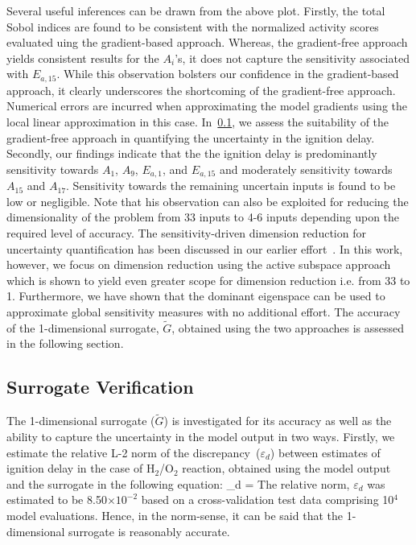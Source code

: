 Several useful inferences can be drawn from the above plot. Firstly, the total Sobol indices are found to be
consistent
with the normalized activity scores evaluated uing the gradient-based approach. Whereas, the gradient-free
approach yields consistent results for the $A_i$'s, it does not capture the sensitivity associated with
$E_{a,15}$. While this observation bolsters our confidence in the gradient-based approach, it clearly
underscores the shortcoming of the gradient-free approach. Numerical errors are incurred when approximating
the model gradients using the local linear approximation in this case. In~\ref{sub:verify}, we assess the
suitability of the gradient-free approach in quantifying the uncertainty in the ignition delay. 
Secondly, our findings indicate that the  
the ignition delay is predominantly sensitivity towards $A_1$, $A_9$, $E_{a,1}$, and $E_{a,15}$ and 
moderately sensitivity towards $A_{15}$ and $A_{17}$. Sensitivity towards the remaining uncertain inputs is
found to be low or negligible. Note that his observation can also be exploited for reducing the 
dimensionality of the problem from 33 inputs to 4-6 inputs depending upon the required level of accuracy.
The sensitivity-driven dimension reduction for uncertainty quantification has been
discussed in our earlier effort~\cite{Vohra:2018}. In this work, however, we focus on dimension reduction using the active 
subspace approach which is shown to yield even greater scope for dimension reduction i.e. from 33 to 1. Furthermore, we have
shown that the dominant eigenspace can be used to approximate global sensitivity measures with no additional effort.
The accuracy of the 1-dimensional surrogate, $\tilde{G}$, obtained using the two approaches is assessed in the following section. 

\subsection{Surrogate Verification}
\label{sub:verify}

The 1-dimensional surrogate ($\tilde{G}$) is investigated for its accuracy as well as the ability to capture the 
uncertainty in the
model output in two ways. Firstly, we estimate the relative L-2 norm of the discrepancy~($\varepsilon_d$)
between estimates of ignition delay in the case of H$_2$/O$_2$ reaction, obtained using the 
model output and the surrogate in the following equation:
%
\be
\varepsilon_d = 
\ee
%
The relative norm, $\varepsilon_d$ was estimated to be 8.50$\times10^{-2}$ based on a cross-validation test data
comprising 10$^{4}$ model evaluations. Hence, in the norm-sense, it can be said that the 1-dimensional surrogate is 
reasonably accurate. 

